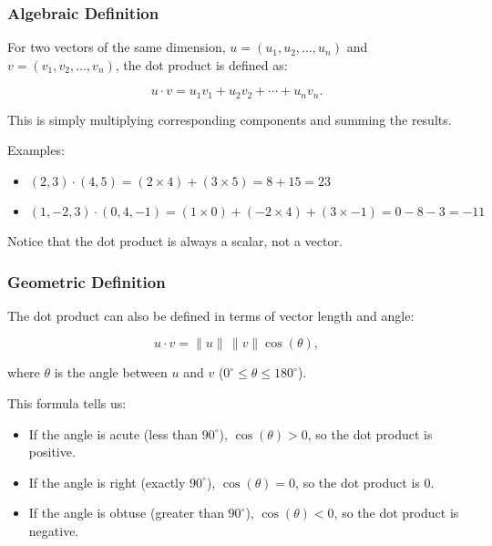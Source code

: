 \documentclass[
  letterpaper,
  DIV=11,
  numbers=noendperiod]{scrreprt}
\providecommand{\tightlist}{%
  \setlength{\itemsep}{0pt}\setlength{\parskip}{0pt}}
\begin{document}
\subsubsection{Algebraic Definition}\label{algebraic-definition}

For two vectors of the same dimension, \(u = (u_1, u_2, \ldots, u_n)\)
and \(v = (v_1, v_2, \ldots, v_n)\), the dot product is defined as:

\[
u \cdot v = u_1 v_1 + u_2 v_2 + \cdots + u_n v_n.
\]

This is simply multiplying corresponding components and summing the
results.

Examples:

\begin{itemize}
\tightlist
\item
  \((2, 3) \cdot (4, 5) = (2 \times 4) + (3 \times 5) = 8 + 15 = 23\)\\
\item
  \((1, -2, 3) \cdot (0, 4, -1) = (1 \times 0) + (-2 \times 4) + (3 \times -1) = 0 - 8 - 3 = -11\)
\end{itemize}

Notice that the dot product is always a scalar, not a vector.

\subsubsection{Geometric Definition}\label{geometric-definition}

The dot product can also be defined in terms of vector length and angle:

\[
u \cdot v = \|u\| \, \|v\| \cos(\theta),
\]

where \(\theta\) is the angle between \(u\) and \(v\)
(\(0^\circ \leq \theta \leq 180^\circ\)).

This formula tells us:

\begin{itemize}
\tightlist
\item
  If the angle is acute (less than \(90^\circ\)), \(\cos(\theta) > 0\),
  so the dot product is positive.\\
\item
  If the angle is right (exactly \(90^\circ\)), \(\cos(\theta) = 0\), so
  the dot product is 0.\\
\item
  If the angle is obtuse (greater than \(90^\circ\)),
  \(\cos(\theta) < 0\), so the dot product is negative.
\end{itemize}
\end{document}
